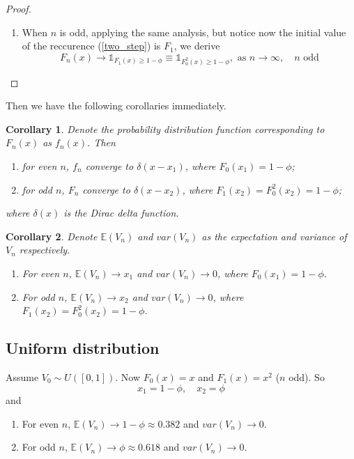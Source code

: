 \documentclass{article}
\newtheorem{col}{Corollary}[section]
\begin{document}
\begin{spacing}{1.4}
\begin{proof}
\begin{enumerate}
    \item When $n$ is odd, applying the same analysis, but notice now the initial value of the reccurence (\ref{two_step}) is $F_1$, we derive
    \begin{equation}
      F_n(x) \to \mathds{1}_{F_1(x) \geq 1 - \phi} \equiv \mathds{1}_{F_0^2(x) \geq 1 - \phi}, \text{ as } n \to \infty, \quad \text{$n$ odd}
    \end{equation}

  \end{enumerate}
\end{proof}

Then we have the following corollaries immediately.
\begin{col}
  Denote the probability distribution function corresponding to $F_n(x)$ as $f_n(x)$. Then
  \begin{enumerate}
    \item for even $n$, $f_n$ converge to $\delta(x - x_1)$, where $F_0(x_1) = 1 - \phi$;
    \item for odd $n$, $F_n$ converge to $\delta(x - x_2)$, where $F_1(x_2) = F_0^2(x_2) = 1 - \phi$;
  \end{enumerate}
  where $\delta(x)$ is the Dirac delta function.
\end{col}

\begin{col} Denote $\mathbb{E} (V_n)$ and $var(V_n)$ as the expectation and variance of $V_n$ respectively.
  \begin{enumerate}
    \item For even $n$, $\mathbb{E} (V_n) \to x_1$ and $var(V_n) \to 0$, where $F_0(x_1) = 1 - \phi$.
    \item For odd $n$, $\mathbb{E} (V_n) \to x_2$ and $var(V_n) \to 0$, where $F_1(x_2) = F_0^2(x_2) = 1 - \phi$.
  \end{enumerate}
\end{col}

\subsection{Uniform distribution}
Assume $V_0 \sim U([0, 1])$. Now $F_0(x) = x$ and $F_1(x) = x^2$ ($n$ odd). So
\begin{equation}
  x_1 = 1 - \phi, \quad x_2 = \phi
\end{equation}
and
\begin{enumerate}
  \item For even $n$, $\mathbb{E} (V_n) \to 1 - \phi \approx 0.382$ and $var(V_n) \to 0$.
  \item For odd $n$, $\mathbb{E} (V_n) \to \phi \approx 0.618$ and $var(V_n) \to 0$.
\end{enumerate}


\end{spacing}
\end{document}

